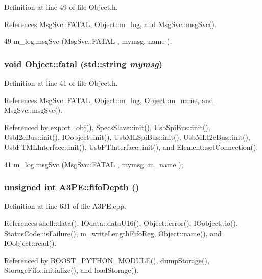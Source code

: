Definition at line 49 of file Object.h.

References MsgSvc::FATAL, Object::m\_\-log, and MsgSvc::msgSvc().


\begin{DoxyCode}
49 { m_log.msgSvc (MsgSvc::FATAL   , mymsg, name ); }
\end{DoxyCode}
\hypertarget{classObject_aad5a16aac7516ce65bd5ec02ab07fc80}{
\subsubsection[{fatal}]{\setlength{\rightskip}{0pt plus 5cm}void Object::fatal (std::string {\em mymsg})}}
\label{classObject_aad5a16aac7516ce65bd5ec02ab07fc80}


Definition at line 41 of file Object.h.

References MsgSvc::FATAL, Object::m\_\-log, Object::m\_\-name, and MsgSvc::msgSvc().

Referenced by export\_\-obj(), SpecsSlave::init(), UsbSpiBus::init(), UsbI2cBus::init(), IOobject::init(), UsbMLSpiBus::init(), UsbMLI2cBus::init(), UsbFTMLInterface::init(), UsbFTInterface::init(), and Element::setConnection().


\begin{DoxyCode}
41 { m_log.msgSvc (MsgSvc::FATAL   , mymsg, m_name ); }
\end{DoxyCode}
\hypertarget{classA3PE_a8bb523e4a7a5dbb6ab3c5549ebf6db86}{
\subsubsection[{fifoDepth}]{\setlength{\rightskip}{0pt plus 5cm}unsigned int A3PE::fifoDepth ()}}
\label{classA3PE_a8bb523e4a7a5dbb6ab3c5549ebf6db86}


Definition at line 631 of file A3PE.cpp.

References shell::data(), IOdata::dataU16(), Object::error(), IOobject::io(), StatusCode::isFailure(), m\_\-writeLengthFifoReg, Object::name(), and IOobject::read().

Referenced by BOOST\_\-PYTHON\_\-MODULE(), dumpStorage(), StorageFifo::initialize(), and loadStorage().


